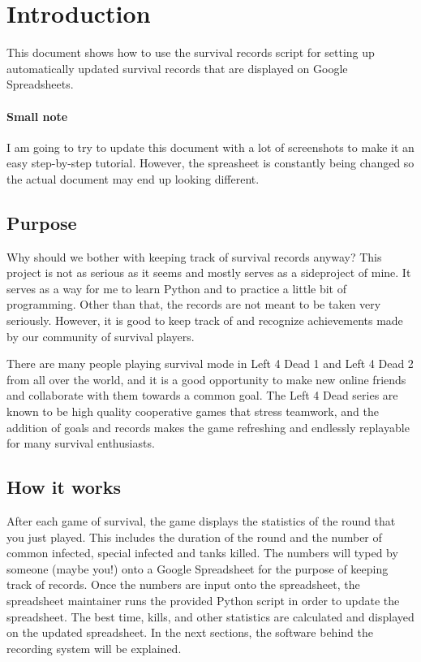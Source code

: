 \section{Introduction}
This document shows how to use the survival records script for setting up automatically updated survival records that are displayed on Google Spreadsheets.
\paragraph{Small note}
I am going to try to update this document with a lot of screenshots to make it an easy step-by-step tutorial. However, the spreasheet is constantly being changed so the actual document may end up looking different.
\subsection{Purpose}
Why should we bother with keeping track of survival records anyway? This project is not as serious as it seems and mostly serves as a sideproject of mine. It serves as a way for me to learn Python and to practice a little bit of programming. Other than that, the records are not meant to be taken very seriously. However, it is good to keep track of and recognize achievements made by our community of survival players.

There are many people playing survival mode in Left 4 Dead 1 and Left 4 Dead 2 from all over the world, and it is a good opportunity to make new online friends and collaborate with them towards a common goal. The Left 4 Dead series are known to be high quality cooperative games that stress teamwork, and the addition of goals and records makes the game refreshing and endlessly replayable for many survival enthusiasts.

\subsection{How it works}
After each game of survival, the game displays the statistics of the round that you just played. This includes the duration of the round and the number of common infected, special infected and tanks killed. The numbers will typed by someone (maybe you!) onto a Google Spreadsheet for the purpose of keeping track of records. Once the numbers are input onto the spreadsheet, the spreadsheet maintainer runs the provided Python script in order to update the spreadsheet. The best time, kills, and other statistics are calculated and displayed on the updated spreadsheet. In the next sections, the software behind the recording system will be explained.

